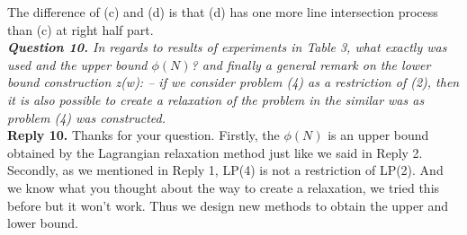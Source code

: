 \documentclass[11pt]{article}
\begin{document}
The difference of (c) and (d) is that (d) has one more line intersection process than (c) at right half part.
~\\[4mm]
\noindent \textit{\textbf{Question 10.}
In regards to results of experiments in Table 3, what exactly was used and the upper bound $\phi(N)$? and finally a general remark on the lower bound construction z(w):
-- if we consider problem (4) as a restriction of (2), then it is also possible to create a relaxation of the problem in the similar was as problem (4) was constructed.}
\\[2mm]
\noindent \textbf{Reply 10.}
Thanks for your question. Firstly, the $\phi(N)$ is an upper bound obtained by the Lagrangian relaxation method just like we said in Reply 2.
Secondly, as we mentioned in Reply 1, LP(4) is not a restriction of LP(2). And we know what you thought about the way to create a relaxation, we tried this before but it won't work. Thus we design new methods to obtain the upper and lower bound.

~\\[4mm]


%
%
%
%
%
%
%
%
\end{document}
